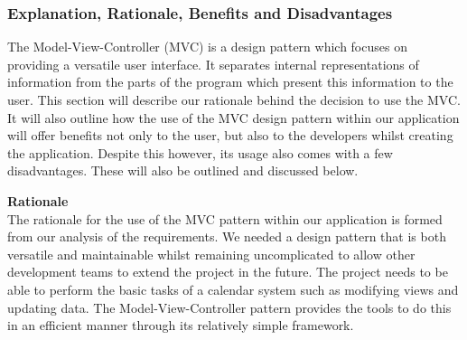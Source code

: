 \documentclass[a4paper]{article}
\begin{document}
\subsubsection{Explanation, Rationale, Benefits and Disadvantages}
The Model-View-Controller (MVC) is a design pattern which focuses on providing a versatile user interface. It separates internal representations of information from the parts of the program which present this information to the user. This section will describe our rationale behind the decision to use the MVC. It will also outline how the use of the MVC design pattern within our application will offer benefits not only to the user, but also to the developers whilst creating the application. Despite this however, its usage also comes with a few disadvantages. These will also be outlined and discussed below.

\textbf{Rationale} \\
The rationale for the use of the MVC pattern within our application is formed from our analysis of the requirements. We needed a design pattern that is both versatile and maintainable whilst remaining uncomplicated to allow other development teams to extend the project in the future. The project needs to be able to perform the basic tasks of a calendar system such as modifying views and updating data. The Model-View-Controller pattern provides the tools to do this in an efficient manner through its relatively simple framework.
\end{document}
